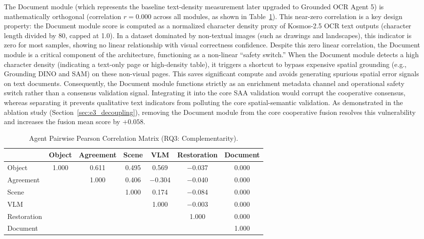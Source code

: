 \documentclass[12pt,onecolumn,a4paper]{IEEEtran}
\begin{document}
The Document module (which represents the baseline text-density measurement later upgraded to Grounded OCR Agent 5) is mathematically orthogonal (correlation $r = 0.000$ across all modules, as shown in Table~\ref{tab:diversity}). This near-zero correlation is a key design property: the Document module score is computed as a normalized character density proxy of Kosmos-2.5 OCR text outputs (character length divided by 80, capped at 1.0). In a dataset dominated by non-textual images (such as drawings and landscapes), this indicator is zero for most samples, showing no linear relationship with visual correctness confidence. Despite this zero linear correlation, the Document module is a critical component of the architecture, functioning as a non-linear ``safety switch.'' When the Document module detects a high character density (indicating a text-only page or high-density table), it triggers a shortcut to bypass expensive spatial grounding (e.g., Grounding DINO and SAM) on these non-visual pages. This saves significant compute and avoids generating spurious spatial error signals on text documents. Consequently, the Document module functions strictly as an enrichment metadata channel and operational safety switch rather than a consensus validation signal. Integrating it into the core SAA validation would corrupt the cooperative consensus, whereas separating it prevents qualitative text indicators from polluting the core spatial-semantic validation. As demonstrated in the ablation study (Section~\ref{sec:e3_decoupling}), removing the Document module from the core cooperative fusion resolves this vulnerability and increases the fusion mean score by $+0.058$.

\begin{table}[!htbp]
\centering
\caption{Agent Pairwise Pearson Correlation Matrix (RQ3: Complementarity).}
\label{tab:diversity}
\begin{tabular}{lcccccc}
\toprule
 & Object & Agreement & Scene & VLM & Restoration & Document \\
\midrule
Object      & 1.000 & 0.611 & 0.495 & 0.569 & $-$0.037 & 0.000 \\
Agreement   &       & 1.000 & 0.406 & $-$0.304 & $-$0.040 & 0.000 \\
Scene       &       &       & 1.000 & 0.174 & $-$0.084 & 0.000 \\
VLM         &       &       &       & 1.000 & $-$0.003 & 0.000 \\
Restoration &       &       &       &       & 1.000    & 0.000 \\
Document    &       &       &       &       &           & 1.000 \\
\bottomrule
\end{tabular}
\end{table}
\end{document}

